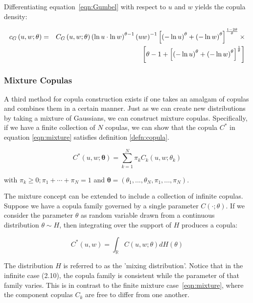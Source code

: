 \documentclass[12pt]{article}
\begin{document}
Differentiating equation~\ref{eqn:Gumbel} with respect to $u$ and $w$ yields
the copula density:

\begin{eqnarray}
c_{G}\left(u,w;\theta\right) &=& C_{G}\left(u,w;\theta\right)\left(\ln u\cdot\ln w\right)^{\theta -1}\left(uw\right)^{-1}\left[\left(-\ln u\right)^{\theta}+\left(-\ln w\right)^{\theta}\right]^{\frac{1-2\theta}{\theta}}\times  \notag \\
&& \left[\theta -1+\left[\left(-\ln u\right)^{\theta}+\left(-\ln w\right)^{\theta}\right]^{\frac{1}{\theta}}\right]
\end{eqnarray}

\subsubsection{Mixture Copulas} \label{sec:mixtureCopula}

A third method for copula construction exists if one takes an amalgam of
copulas and combines them in a certain manner. Just as we can create new
distributions by taking a mixture of Gaussians, we can construct mixture
copulas. Specifically, if we have a finite collection of $N$ copulas, we
can show that the copula $C^{\ast}$ in equation \ref{eqn:mixture}
satisfies definition \ref{defn:copula}.

\begin{equation} \label{eqn:mixture}
    C^{\ast} \left(u, w; \boldsymbol{\theta} \right) = \sum_{k=1}^{N} \pi_{k} C_{k} \left(u, w; \theta _{k} \right)
\end{equation}

with $\pi _{k} \geq 0; \pi_{1} + \cdots + \pi_{N} = 1$ and
$\boldsymbol{\theta} = \left(\theta_{1}, ..., \theta_{N}, \pi_{1}, ..., \pi_{N} \right)$.

\bigskip

The mixture concept can be extended to include a collection of infinite
copulas. Suppose we have a copula family governed by a single parameter
$C\left(\cdot;\theta\right)$. If we consider the parameter $\theta$ as
random variable drawn from a continuous distribution $\theta\sim H$, then
integrating over the support of $H$ produces a copula:

\begin{equation}
C^{\ast}\left( u,w\right) =\int_{\mathbb{R}}C\left(u,w;\theta\right)dH\left(\theta\right)
\end{equation}

The distribution $H$ is referred to as the 'mixing distribution'. Notice
that in the infinite case (2.10), the copula family is consistent while
the parameter of that family varies. This is in contrast to the finite
mixture case~\ref{eqn:mixture}, where the component copulas $C_{k}$ are
free to differ from one another.
\end{document}
